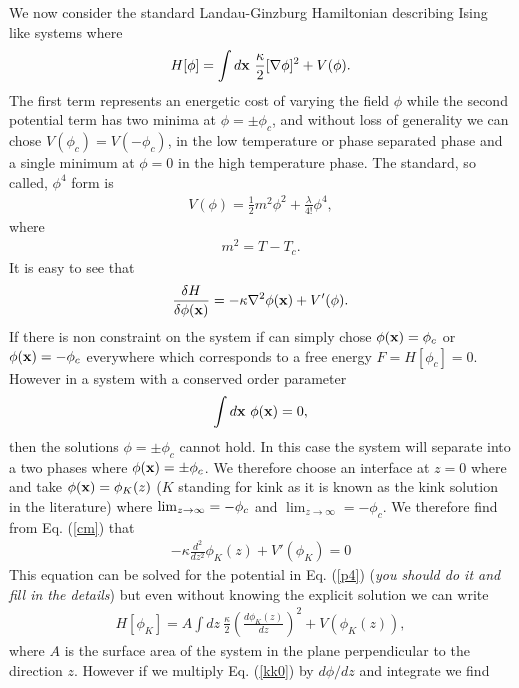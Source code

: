 We now consider the standard Landau-Ginzburg Hamiltonian describing Ising like systems where
\begin{align}
H[\phi] = \int d{\bf x} \ \frac{\kappa}{2}[\nabla \phi]^2 + V(\phi) .
\end{align}
The first term represents an energetic cost of varying the field $\phi$ while the second potential term has two minima at $\phi=\pm \phi_c$, and without loss of generality we can chose  $V(\phi_c)=V(-\phi_c)$, in the low temperature or phase separated phase and a single minimum at $\phi=0$ in the high temperature phase. The standard, so called, $\phi^4$ form is
\begin{align}
V(\phi) = \frac{1}{2} m^2 \phi^2 + \frac{\lambda}{4!} \phi^4,\label{p4}
\end{align} 
where 
\begin{align}
m^2 = T-T_c.
\end{align}
It is easy to see that 
\begin{align}
\frac{\delta H}{\delta \phi({\bf x})} = -\kappa \nabla^2 \phi({\bf x}) + V'(\phi).\label{cm}
\end{align}
If there is non constraint on the system if can simply chose $\phi({\bf x}) =\phi_c$ or $\phi({\bf x}) =-\phi_c$ everywhere which corresponds to a  free energy $F=H[\phi_c]=0$. However in a system with a conserved order parameter
\begin{align}
\int d{\bf x} \  \phi({\bf x})=0, 
\end{align}
then the solutions $\phi=\pm \phi_c$ cannot hold. In this case the system will separate into a two phases where $\phi({\bf x})= \pm \phi_c$. We therefore choose an interface at $z=0$ where 
and take $\phi({\bf x}) = \phi_K(z)$ ($K$ standing for kink as it is known as the kink solution in the literature) where $\lim_{z\to\-\infty}=-\phi_c$ and  $\lim_{z\to\infty}=-\phi_c$. 
We therefore find from Eq. (\ref{cm}) that
\begin{align}
-\kappa \frac{d^2 }{dz^2}\phi_K(z)  + V'(\phi_K) = 0 \label{kk0}
\end{align}
This equation can be solved for the potential in Eq. (\ref{p4}) ({\em you should do it and fill in the details}) but even without knowing the explicit solution we can write
\begin{align}
H[\phi_K]=  A\int dz \ \frac{\kappa}{2}\left(\frac{d\phi_K(z)}{dz}\right)^2 + V(\phi_K(z)),\label{kk1}
\end{align}
where $A$ is the surface area of the system in the plane perpendicular to the direction $z$. 
However if we multiply Eq. (\ref{kk0}) by $d\phi/dz$ and integrate we find
